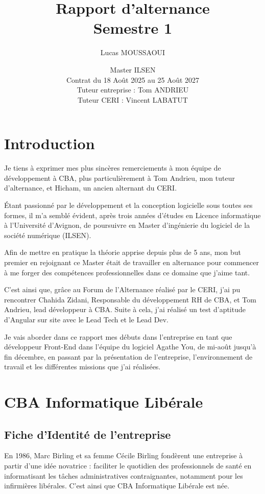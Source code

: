 \documentclass{article}
\title{
	Rapport d'alternance \\
        Semestre 1
}
\author{
	Lucas MOUSSAOUI
}
\date{
    Master ILSEN\\
    Contrat du 18 Août 2025 au 25 Août 2027\\
    Tuteur entreprise : Tom ANDRIEU\\
    Tuteur CERI : Vincent LABATUT
}
\begin{document}
\initDocument
\sloppy

\section{Introduction}

Je tiens à exprimer mes plus sincères remerciements à mon équipe de développement à CBA, plus particulièrement à Tom Andrieu, mon tuteur d'alternance, et Hicham, un ancien alternant du CERI.

Étant passionné par le développement et la conception logicielle sous toutes ses formes, il m'a semblé évident, après trois années d'études en Licence informatique à l'Université d'Avignon, de poursuivre en Master d'ingénierie du logiciel de la société numérique (ILSEN).

Afin de mettre en pratique la théorie apprise depuis plus de 5 ans, mon but premier en rejoignant ce Master était de travailler en alternance pour commencer à me forger des compétences professionnelles dans ce domaine que j'aime tant.

C'est ainsi que, grâce au Forum de l'Alternance réalisé par le CERI, j'ai pu rencontrer Chahida Zidani, Responsable du développement RH de CBA, et Tom Andrieu, lead développeur à CBA. 
Suite à cela, j'ai réalisé un test d'aptitude d'Angular sur site avec le Lead Tech et le Lead Dev.

Je vais aborder dans ce rapport mes débuts dans l'entreprise en tant que développeur Front-End dans l'équipe du logiciel Agathe You, de mi-août jusqu'à fin décembre, en passant par la présentation de l'entreprise, l'environnement de travail et les différentes missions que j'ai réalisées.

\section{CBA Informatique Libérale}

\subsection{Fiche d'Identité de l'entreprise}

En 1986, Marc Birling et sa femme Cécile Birling fondèrent une entreprise à partir d'une idée novatrice : faciliter le quotidien des professionnels de santé en informatisant les tâches administratives contraignantes, notamment pour les infirmières libérales. C'est ainsi que CBA Informatique Libérale est née.
\end{document}
